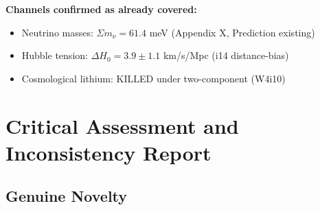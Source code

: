 \documentclass[11pt]{article}
\begin{document}
\bigskip
\noindent\textbf{Channels confirmed as already covered:}
\begin{itemize}
\item Neutrino masses: $\Sigma m_\nu = 61.4$ meV (Appendix X, Prediction existing)
\item Hubble tension: $\Delta H_0 = 3.9 \pm 1.1$ km/s/Mpc (i14 distance-bias)
\item Cosmological lithium: KILLED under two-component (W4i10)
\end{itemize}

\section{Critical Assessment and Inconsistency Report}
\label{sec:assessment}

\subsection{Genuine Novelty}
\end{document}
